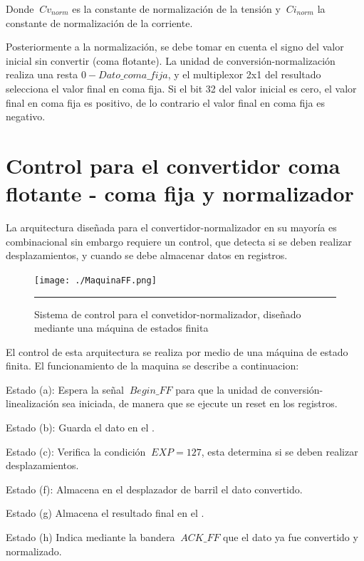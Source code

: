  Donde $\ Cv_{norm}$ es la constante de normalización de la tensión y $\ Ci_{norm}$ la constante de normalización de la corriente. 
 
 Posteriormente a la normalización, se debe tomar en cuenta el signo del valor inicial sin convertir (coma flotante). La unidad de conversión-normalización realiza una resta $0-Dato\_coma\_fija$, y el multiplexor 2x1 del resultado selecciona el valor final en coma fija. Si el bit 32 del valor inicial es cero, el valor final en coma fija es positivo, de lo contrario el valor final en coma fija es negativo. 
  
\section{Control para el convertidor coma flotante - coma fija y normalizador}

La arquitectura diseñada para el convertidor-normalizador en su mayoría es combinacional sin embargo requiere un control, que detecta si se deben realizar desplazamientos, y cuando se debe almacenar datos en registros. 

\begin{figure}[H]
  \centering
    \texttt{[image: ./MaquinaFF.png]}
    \rule{35em}{0.5pt}
  \caption[Sistema de control para el convetidor-normalizador, diseñado mediante una máquina de estados finita]{Sistema de control para el convetidor-normalizador, diseñado mediante una máquina de estados finita}
  \label{fig:CTRLNORM}
\end{figure} 

El control de esta arquitectura se realiza por medio de una máquina de estado finita. El funcionamiento de la maquina se describe a continuacion:  

\begin{compactitem}
\item Estado (a): Espera la señal $\ Begin\_FF$ para que la unidad de conversión-linealización sea iniciada, de manera que se ejecute un reset en los registros. 
\item Estado (b): Guarda el dato en el . 
\item Estado (c): Verifica la condición $\ EXP=127 $, esta determina si se deben realizar desplazamientos.
\item Estado (f): Almacena en el desplazador de barril el dato convertido. 
\item Estado (g) Almacena el resultado final en el . 
\item Estado (h) Indica mediante la bandera $\ ACK\_FF$ que el dato ya fue convertido y normalizado.
\end{compactitem}


